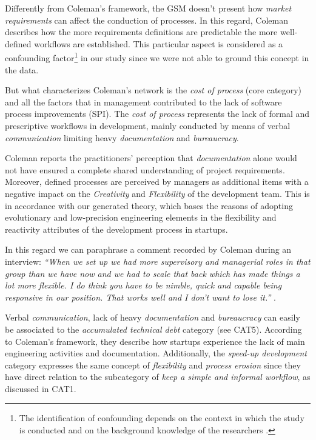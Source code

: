 \documentclass[10pt,journal,letterpaper,compsoc]{IEEEtran}
\begin{document}
Differently from Coleman's framework, the GSM doesn't present how \textit{market requirements} can affect the conduction of processes. In this regard, Coleman describes how the more requirements definitions are predictable the more well-defined workflows are established. This particular aspect is considered as a confounding factor\footnote{The identification of confounding depends on the context in which the study is conducted and on the background knowledge of the researchers \cite{Pearl2011}.}  in our study since we were not able to ground this concept in the data.

But what characterizes Coleman's network is the \textit{cost of process} (core category) and all the factors that in management contributed to the lack of software process improvements (SPI). The \textit{cost of process} represents the  lack of formal and prescriptive workflows in development, mainly conducted by means of verbal \textit{communication} limiting heavy \textit{documentation} and \textit{bureaucracy}. 

Coleman reports the practitioners' perception that \textit{documentation} alone would not have ensured a complete shared understanding of project requirements. Moreover, defined processes are perceived by managers as additional items with a negative impact on the \textit{Creativity} and \textit{Flexibility} of the development team. This is in accordance with our generated theory, which bases the reasons of adopting evolutionary and low-precision engineering elements in the flexibility and reactivity attributes of the development process in startups.  

In this regard we can paraphrase a comment recorded by Coleman during an interview: \textit{``When we set up we had more supervisory and managerial roles in that group than we have now and we had to scale that back which has made things a lot more flexible. I do think you have to be nimble, quick and capable being responsive in our position. That works well and I don't want to lose it.''} \cite{Coleman2007}.

Verbal \textit{communication}, lack of heavy \textit{documentation} and \textit{bureaucracy} can easily be associated to the \textit{accumulated technical debt} category (see CAT5). According to Coleman's framework, they describe how startups experience the lack of main engineering activities and documentation. Additionally, the \textit{speed-up development} category expresses the same concept of \textit{flexibility} and \textit{process erosion} since they have direct relation to the subcategory of \textit{keep a simple and informal workflow}, as discussed in CAT1.
\end{document}
